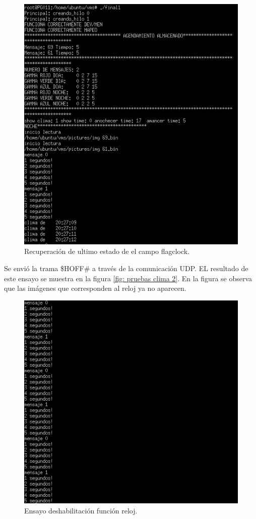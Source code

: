 \begin{figure}[htpb]
	\centering
	\includegraphics[scale=0.8]{Figures/pruebaclima3.png} 
	\caption{Recuperación de ultimo estado de el campo flagclock.}
	\label{fig: ensayo reloj 3}
\end{figure}

Se envió la trama \$HOFF\# a través de la comunicación UDP.  EL resultado de este ensayo se muestra en la figura \ref{fig: pruebas clima 2}. En la figura se observa que las imágenes que corresponden al reloj ya no aparecen.

\begin{figure}[htpb]
	\centering
	\includegraphics[scale=0.8]{Figures/pruebareloj4.png} 
	\caption{Ensayo deshabilitación función reloj.}
	\label{fig: ensayo reloj 4}
\end{figure}




